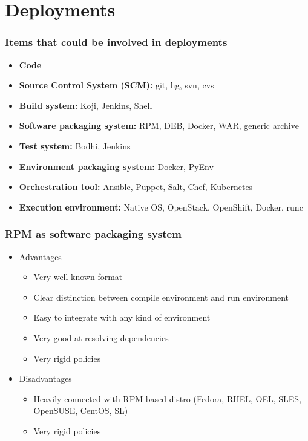 \documentclass[t,aspectratio=169]{beamer}
\begin{document}
\section{Deployments}
\begin{frame}
    \frametitle{Items that could be involved in deployments}
    \begin{itemize}
        \item<2-> \textbf{Code}
        \item<3-> \textbf{Source Control System (SCM):} git, hg, svn, cvs
        \item<4-> \textbf{Build system:} Koji, Jenkins, Shell
        \item<5-> \textbf{Software packaging system:} RPM, DEB, Docker, WAR, generic archive
        \item<6-> \textbf{Test system:} Bodhi, Jenkins
        \item<7-> \textbf{Environment packaging system:} Docker, PyEnv
        \item<8-> \textbf{Orchestration tool:} Ansible, Puppet, Salt, Chef, Kubernetes
        \item<9-> \textbf{Execution environment:} Native OS, OpenStack, OpenShift, Docker, runc
    \end{itemize}
\end{frame}

\begin{frame}
    \frametitle{RPM as software packaging system}
    \begin{itemize}
        \item<2-> Advantages
        \begin{itemize}
            \item<3-> Very well known format
            \item<4-> Clear distinction between compile environment and run environment
            \item<5-> Easy to integrate with any kind of environment
            \item<6-> Very good at resolving dependencies
            \item<7-> Very rigid policies
        \end{itemize}
        \item<8-> Disadvantages
        \begin{itemize}
            \item<9-> Heavily connected with RPM-based distro (Fedora, RHEL, OEL, SLES, OpenSUSE, CentOS, SL)
            \item<10-> Very rigid policies
        \end{itemize}
    \end{itemize}
\end{frame}
\end{document}
